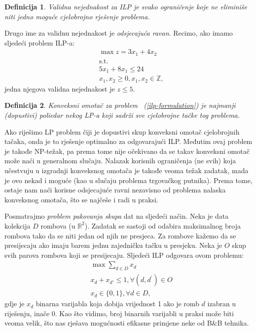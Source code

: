 \documentclass[a4paper, utf8, 11pt, colorlinks]{book}
\newtheorem{definition}{Definicija}
\begin{document}
 \begin{definition}{Validna nejednakost} za ILP je svako ograničenje koje ne eliminiše niti   jedno moguće cjelobrojno rješenje problema.
 \end{definition}
 Drugo ime za {validnu nejednakost} je \emph{odsjecajuća ravan}.
Recimo, ako imamo sljedeći problem ILP-a:
\begin{align*}
    &\max z = 3x_1 + 4 x_2 \\
    &\mbox{s.t.} \\
    &5x_1 + 8x_1 \leq 24 \\
    & x_1, x_2 \geq 0, x_1,x_2\in \mathbb{Z},
\end{align*}
jedna njegova validna nejednakost je $z \leq 5$. 

\begin{definition}
      Konveksni omotač za problem  ~(\ref{ilp-formulation}) je najmanji (dopustivi) poliedar nekog LP-a koji sadrži sve cjelobrojne tačke tog problema.
\end{definition}
Ako riješimo LP problem čiji je dopustivi skup konveksni omotač cjelobrojnih tačaka, onda je to rješenje optimalno za odgovarajući ILP. Međutim ovaj problem je takođe  NP-težak, pa prema tome nije očekivano da se takav konveksni omotač može naći u generalnom slučaju. Nalazak korisnih ograničenja (ne svih) koja učestvuju u izgradnji konveksnog omotača je takođe veoma težak zadatak, mada je ovo nekad i moguće (kao u slučaju problema trgovačkog putnika). Prema tome, ostaje nam naći korisne odsjecajuće ravni nezavisno od problema nalaska konveksnog omotača, što se najčeše i radi  u praksi. 

Posmatrajmo   \emph{problem pakovanja skupa} dat na sljedeći način. Neka je data kolekcija $D$ rombova (u $\mathbb{R}^2$). 
Zadatak se sastoji od odabira maksimalnog broja rombova tako da se niti jedan od njih ne presjeca.  Za rombove kažemo da se presijecaju ako imaju barem jednu zajedničku tačku u presjeku. 
Neka je $O$ skup svih parova rombova koji se presijecaju. Sljedeći ILP odgovara ovom problemu:
\begin{align*}
    &\max \sum_{d\in D}x_d\\
    & x_d + x_{d'} \leq 1, \forall (d, d^{'}) \in O \\
    & x_d \in \{0,1\}, \forall d \in D,
\end{align*}
gdje je $x_d$ binarna varijabla koja dobija vrijednost 1 ako je romb $d$ izabran u riješenju, inače 0. 
Kao što vidimo, broj binarnih varijabli u praksi može biti veoma velik, što nas rješava mogućnosti efikasne primjene neke od B\&B tehnika.
\end{document}

